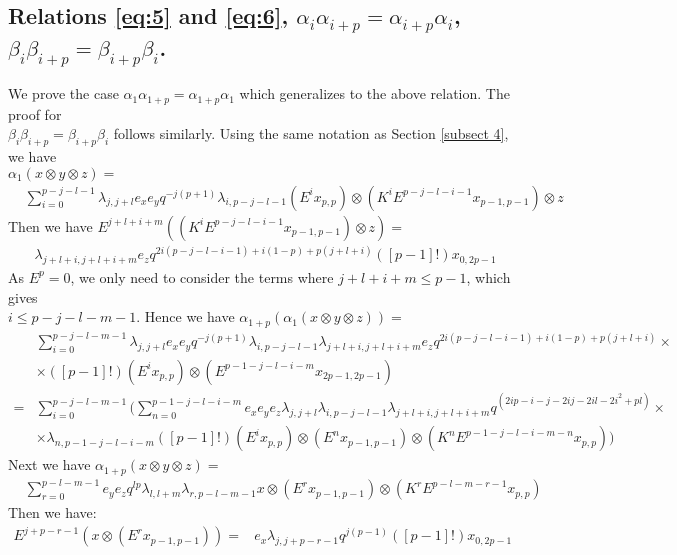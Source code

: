 \documentclass[]{article}
\begin{document}
\subsection{Relations \ref{eq:5} and \ref{eq:6}, $\alpha_{i}\alpha_{i+p}=\alpha_{i+p}\alpha_{i}$, $\beta_{i}\beta_{i+p}=\beta_{i+p}\beta_{i}$.}
We prove the case $\alpha_{1}\alpha_{1+p}=\alpha_{1+p}\alpha_{1}$ which generalizes to the above relation. The proof for\\ $\beta_{i}\beta_{i+p}=\beta_{i+p}\beta_{i}$ follows similarly. Using the same notation as Section \ref{subsect 4}, we have\\ $\alpha_{1}(x\otimes y\otimes z)=$
\begin{align*}
& \sum\limits_{i=0}^{p-j-l-1}\lambda_{j,j+l}e_{x}e_{y}q^{-j(p+1)}\lambda_{i,p-j-l-1}(E^{i}x_{p,p})\otimes(K^{i}E^{p-j-l-i-1}x_{p-1,p-1})\otimes z
\end{align*}
Then we have $E^{j+l+i+m}((K^{i}E^{p-j-l-i-1}x_{p-1,p-1})\otimes z)=$
\begin{align*}
& \lambda_{j+l+i,j+l+i+m}e_{z}q^{2i(p-j-l-i-1)+i(1-p)+p(j+l+i)}([p-1]!)x_{0,2p-1}
\end{align*}
As $E^{p}=0$, we only need to consider the terms where $j+l+i+m\leq p-1$, which gives\\ $i\leq p-j-l-m-1$. Hence we have $\alpha_{1+p}(\alpha_{1}(x\otimes y\otimes z))=$
\begin{align*}
& \sum\limits_{i=0}^{p-j-l-m-1}\lambda_{j,j+l}e_{x}e_{y}q^{-j(p+1)}\lambda_{i,p-j-l-1}\lambda_{j+l+i,j+l+i+m}e_{z}q^{2i(p-j-l-i-1)+i(1-p)+p(j+l+i)}\times\\
&\times([p-1]!)(E^{i}x_{p,p})\otimes(E^{p-1-j-l-i-m}x_{2p-1,2p-1})\\
=&\sum\limits_{i=0}^{p-j-l-m-1}\bigg(\sum\limits_{n=0}^{p-1-j-l-i-m}e_{x}e_{y}e_{z}\lambda_{j,j+l}\lambda_{i,p-j-l-1}\lambda_{j+l+i,j+l+i+m}q^{(2ip-i-j-2ij-2il-2i^{2}+pl)}\times\\
&\times\lambda_{n,p-1-j-l-i-m}([p-1]!)(E^{i}x_{p,p})\otimes(E^{n}x_{p-1,p-1})\otimes(K^{n}E^{p-1-j-l-i-m-n}x_{p,p})\bigg)
\end{align*}
Next we have $\alpha_{1+p}(x\otimes y\otimes z)=$
\begin{align*}
& \sum\limits_{r=0}^{p-l-m-1}e_{y}e_{z}q^{lp}\lambda_{l,l+m}\lambda_{r,p-l-m-1}x\otimes(E^{r}x_{p-1,p-1})\otimes(K^{r}E^{p-l-m-r-1}x_{p,p})
\end{align*}
Then we have:
\begin{align*}
E^{j+p-r-1}(x\otimes(E^{r}x_{p-1,p-1}))=& e_{x}\lambda_{j,j+p-r-1}q^{j(p-1)}([p-1]!)x_{0,2p-1}
\end{align*}
\end{document}
